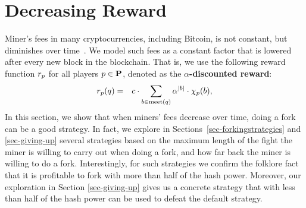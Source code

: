 
\section{Decreasing Reward}
\label{sec-dec}


Miner's fees in many cryptocurrencies, including Bitcoin, is not constant, but diminishes over time~\cite{Bitcoin,Monero,Litecoin,Bcash}. We model such 
fees as a constant factor that is lowered after every new block in the blockchain. That is, 
we use the following reward function $r_p$ for all players $p \in \mathbf{P}$, denoted as the \textbf{$\alpha$-discounted reward}: 
\begin{eqnarray*}
r_p(q) & = & 
c \cdot \sum_{b \in \text{\rm meet}(q)} \alpha^{|b|} \cdot \chi_p(b),
\end{eqnarray*}
In this section, we show that when miners' fees decrease over time, doing a fork can be a good strategy. In fact, we explore in Sections~\ref{sec-forkingstrategies} and \ref{sec-giving-up} several strategies based on the maximum length of the fight the miner is willing to carry out when doing a fork, and how far back the miner is willing to do a fork. Interestingly, for such strategies we confirm the folklore fact that it is profitable to fork with more than half of the hash power. Moreover, our exploration in Section \ref{sec-giving-up} gives us a concrete strategy that with less than half of the hash power 
can be used to defeat the default strategy.

